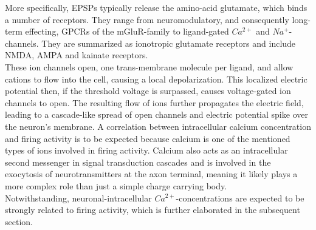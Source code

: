 \documentclass[titlepage]{article}
\begin{document}
More specifically, EPSPs typically release the amino-acid glutamate, which binds a number of receptors. They range from neuromodulatory, and consequently long-term effecting, GPCRs of the mGluR-family to ligand-gated $Ca^{2+}$ and $Na^{+}$-channels. They are summarized as ionotropic glutamate receptors\cite{schmidt_physiologie_2007} and include NMDA, AMPA and kainate receptors\cite{schmidt_physiologie_2007}. \\ 
These ion channels open, one trans-membrane molecule per ligand, and allow cations to flow into the cell, causing a local depolarization\cite{nover_lehrbuch_2005}.
This localized electric potential then, if the threshold voltage is surpassed, causes voltage-gated ion channels to open. The resulting flow of ions further propagates the electric field, leading to a cascade-like spread of open channels and electric potential spike over the neuron's membrane. A correlation between intracellular calcium concentration and firing activity is to be expected\cite{dayan_theoretical_2001} because calcium is one of the mentioned types of ions involved in firing activity. Calcium also acts as an intracellular second messenger in signal transduction cascades and is involved in the exocytosis of neurotransmitters at the axon terminal\cite{schmidt_physiologie_2007}, meaning it likely plays a more complex role than just a simple charge carrying body.\\
Notwithstanding, neuronal-intracellular $Ca^{2+}$-concentrations are expected to be strongly related to firing activity, which is further elaborated in the subsequent section.\\
\end{document}
